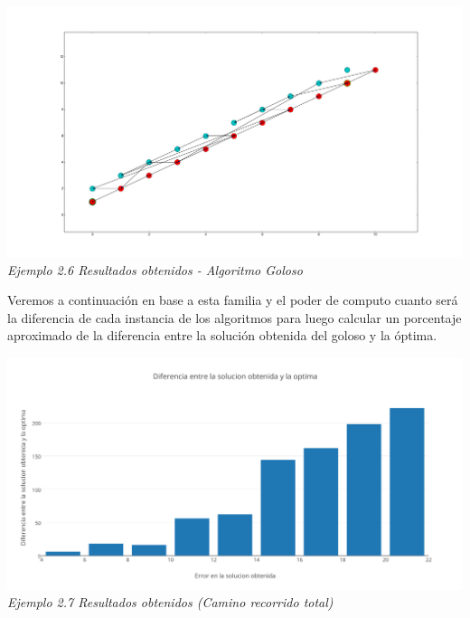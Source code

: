 \vspace*{0.3cm} \vspace*{0.3cm}
  \begin{center}
\includegraphics[scale=0.5]{./EJ2/algunGym0Goloso.png}
\\{\textit{Ejemplo 2.6 Resultados obtenidos - Algoritmo Goloso }}
  \end{center}
  \vspace*{0.3cm}

Veremos a continuaci\'on en base a esta familia y el poder de computo cuanto ser\'a la diferencia de cada instancia de los algoritmos para luego calcular un porcentaje aproximado de la diferencia entre la soluci\'on obtenida del goloso y la \'optima.

\vspace*{0.3cm} \vspace*{0.3cm}
  \begin{center}
\includegraphics[scale=0.5]{./EJ2/algungym0.png}
\\{\textit{Ejemplo 2.7 Resultados obtenidos (Camino recorrido total) }}
  \end{center}
  \vspace*{0.3cm}


